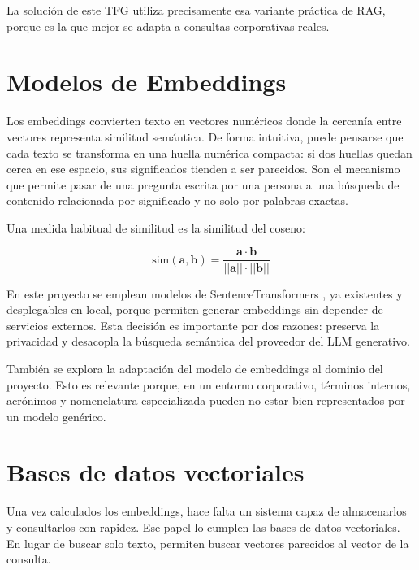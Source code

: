 La solución de este TFG utiliza precisamente esa variante práctica de RAG, porque es la que mejor se adapta a consultas corporativas reales.

\section{Modelos de Embeddings}

Los embeddings convierten texto en vectores numéricos donde la cercanía entre vectores representa similitud semántica. De forma intuitiva, puede pensarse que cada texto se transforma en una huella numérica compacta: si dos huellas quedan cerca en ese espacio, sus significados tienden a ser parecidos. Son el mecanismo que permite pasar de una pregunta escrita por una persona a una búsqueda de contenido relacionada por significado y no solo por palabras exactas.

Una medida habitual de similitud es la similitud del coseno:

\begin{equation}
\text{sim}(\mathbf{a}, \mathbf{b}) = \frac{\mathbf{a} \cdot \mathbf{b}}{||\mathbf{a}|| \cdot ||\mathbf{b}||}
\end{equation}

En este proyecto se emplean modelos de SentenceTransformers \cite{reimers2019sentence,sbertDocs}, ya existentes y desplegables en local, porque permiten generar embeddings sin depender de servicios externos. Esta decisión es importante por dos razones: preserva la privacidad y desacopla la búsqueda semántica del proveedor del LLM generativo.

También se explora la adaptación del modelo de embeddings al dominio del proyecto. Esto es relevante porque, en un entorno corporativo, términos internos, acrónimos y nomenclatura especializada pueden no estar bien representados por un modelo genérico.

\section{Bases de datos vectoriales}

Una vez calculados los embeddings, hace falta un sistema capaz de almacenarlos y consultarlos con rapidez. Ese papel lo cumplen las bases de datos vectoriales. En lugar de buscar solo texto, permiten buscar vectores parecidos al vector de la consulta.

